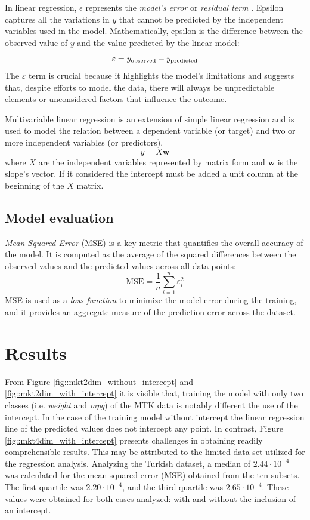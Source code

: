 \documentclass[9pt,technote]{IEEEtran}
\begin{document}
	In linear regression, $\epsilon$ represents the \textit{model's error} or \textit{residual term} . Epsilon captures all the variations in $y$ that cannot be predicted by the independent variables used in the model.
	Mathematically, epsilon is the difference between the observed value of $y$ and the value predicted by the linear model:
	\begin{equation*}
		\varepsilon= y_{\tiny\text{observed}} - y_{\tiny\text{predicted}}
	\end{equation*}
	The $\varepsilon$ term is crucial because it highlights the model's limitations and suggests that, despite efforts to model the data, there will always be unpredictable elements or unconsidered factors that influence the outcome.

	Multivariable linear regression is an extension of simple linear regression and is used to model the relation between a dependent variable (or target) and two or more independent variables (or predictors).
	\begin{equation}
		y = X \mathbf w
	\end{equation}
	where $X$ are the independent variables represented by matrix form and $\mathbf w$ is the slope's vector. If it considered the intercept must be added a unit column at the beginning of the $X$ matrix.
	\subsection{Model evaluation}
	\textit{Mean Squared Error} (MSE) is a key metric that quantifies the overall accuracy of the model. It is computed as the average of the squared differences between the observed values and the predicted values across all data points:
	\begin{equation}
		\text{MSE} = \frac{1}{n} \sum_{i=1}^{n} \varepsilon_i^2
	\end{equation}
	MSE is used as a \textit{loss function} to minimize the model error during the training, and it provides an aggregate measure of the prediction error across the dataset.
	
	\section{Results}
	From Figure \ref{fig::mkt2dim_without_intercept} and \ref{fig::mkt2dim_with_intercept} it is visible that, training the model with only two classes (i.e. \textit{weight} and \textit{mpg}) of the MTK data is notably different the use of the intercept. In the case of the training model without intercept the linear regression line of the predicted values does not intercept any point.
	In contrast, Figure \ref{fig::mkt4dim_with_intercept} presents challenges in obtaining readily comprehensible results. This may be attributed to the limited data set utilized for the regression analysis.
	 Analyzing the Turkish dataset, a median of $2.44 \cdot 10^{-4}$ was calculated for the mean squared error (MSE) obtained from the ten subsets. The first quartile was $2.20 \cdot 10^{-4}$, and the third quartile was $2.65 \cdot 10^{-4}$. These values were obtained for both cases analyzed: with and without the inclusion of an intercept.
	 		
\end{document}
